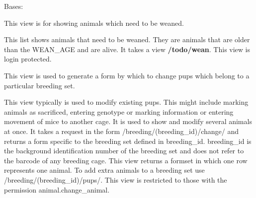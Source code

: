 \documentclass[letterpaper,10pt,english]{sphinxmanual}
\begin{document}

\begin{fulllineitems}
\label{api:mousedb.animal.views.WeanList}
Bases: {\hyperref[api:mousedb.animal.views.AnimalList]{}}

This view is for showing animals which need to be weaned.

This list shows animals that need to be weaned.  They are animals that are older than the WEAN\_AGE and are alive.
It takes a view \textbf{/todo/wean}.
This view is login protected.

\begin{fulllineitems}
\label{api:mousedb.animal.views.WeanList.queryset}
\end{fulllineitems}


\end{fulllineitems}


\begin{fulllineitems}
\label{api:mousedb.animal.views.breeding_change}
This view is used to generate a form by which to change pups which belong to a particular breeding set.

This view typically is used to modify existing pups.  This might include marking animals as sacrificed, entering genotype or marking information or entering movement of mice to another cage.  It is used to show and modify several animals at once.
It takes a request in the form /breeding/(breeding\_id)/change/ and returns a form specific to the breeding set defined in breeding\_id.  breeding\_id is the background identification number of the breeding set and does not refer to the barcode of any breeding cage.
This view returns a formset in which one row represents one animal.  To add extra animals to a breeding set use /breeding/(breeding\_id)/pups/.
This view is restricted to those with the permission animal.change\_animal.

\end{fulllineitems}

\end{document}
